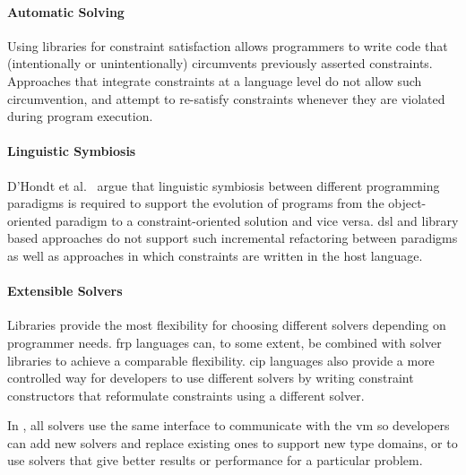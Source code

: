 \paragraph{Automatic Solving}
Using libraries for constraint satisfaction allows programmers to
write code that (intentionally or unintentionally) circumvents
previously asserted constraints. Approaches that integrate constraints
at a language level do not allow such circumvention, and attempt to
re-satisfy constraints whenever they are violated during program
execution.

\paragraph{Linguistic Symbiosis}
D'Hondt et al.~\cite{d2004seamless} argue that linguistic symbiosis
between different programming paradigms is required to support the
evolution of programs from the object-oriented paradigm to a
constraint-oriented solution and vice versa. \ac{dsl} and library
based approaches do not support such incremental refactoring between
paradigms as well as approaches in which constraints are written in the
host language.

\paragraph{Extensible Solvers}
Libraries provide the most flexibility for choosing different solvers
depending on programmer needs. \Ac{frp} languages can, to some extent,
be combined with solver libraries to achieve a comparable
flexibility. \ac{cip} languages also provide a more controlled way for
developers to use different solvers by writing constraint constructors
that reformulate constraints using a different solver.

In \langname, all solvers use the same interface to communicate with
the \ac{vm} so developers can add new solvers and replace existing
ones to support new type domains, or to use solvers that give better
results or performance for a particular problem.

